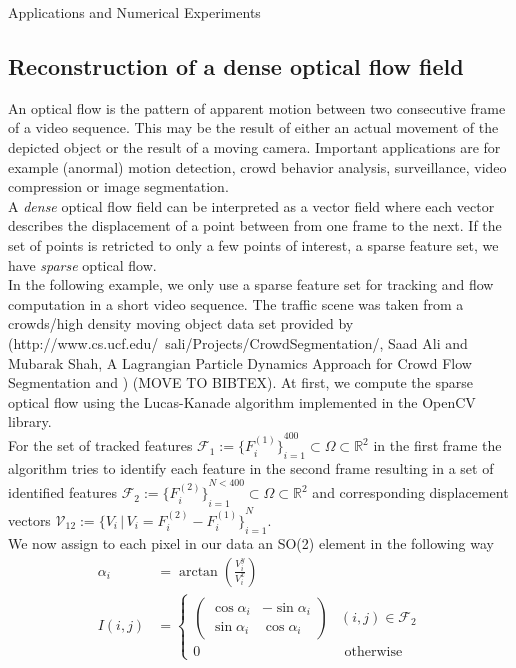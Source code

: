 \begin{chapter}{Applications and Numerical Experiments}
\FloatBarrier
\subsection{Reconstruction of a dense optical flow field} %
\label{sub:reconstructionDenseOpticalFlow}
An optical flow is the pattern of apparent motion between two consecutive frame of a video sequence. This may be the result of either an actual movement of the depicted object
or the result of a moving camera. Important applications are for example (anormal) motion detection, crowd behavior analysis, surveillance, video compression or image segmentation.\\
A \emph{dense} optical flow field can be interpreted as a vector field where each vector describes the displacement of a point between from one frame to the next. If
the set of points is retricted to only a few points of interest, a sparse feature set, we have \emph{sparse} optical flow.\\

In the following example, we only use a sparse feature set for tracking and flow computation in a short video sequence. The traffic scene was taken from a crowds/high density moving object data 
set provided by \cite{sali} (http://www.cs.ucf.edu/~sali/Projects/CrowdSegmentation/, Saad Ali and Mubarak Shah, A Lagrangian Particle Dynamics Approach for Crowd Flow Segmentation and )
(MOVE TO BIBTEX). At first, we compute the sparse optical flow using the Lucas-Kanade algorithm \cite{LucasKanade} implemented in the OpenCV library. \\
For the set of tracked features 
$\mathcal{F}_1:=\lbrace{F^{(1)}_i\rbrace}_{i=1}^{400}\subset\Omega\subset\mathbb{R}^2$ in the first frame the algorithm tries to identify each feature in the second frame resulting in a set of
identified features $\mathcal{F}_2:=\lbrace{F^{(2)}_i\rbrace}_{i=1}^{N<400}\subset\Omega\subset\mathbb{R}^2$ and corresponding displacement vectors 
$\mathcal{V}_{12}:=\lbrace{V_i\,|\,V_i=F_i^{(2)}-F_i^{(1)}\rbrace}_{i=1}^{N}$.\\

We now assign to each pixel in our data an SO(2) element in the following way
\begin{align}
    \alpha_i &=\arctan\left(\frac{V^y_i}{V^x_i}\right) \\
    I(i,j) &= 
    \begin{cases}
    	\begin{pmatrix}
	    \cos\alpha_i    & -\sin\alpha_i\\
	    \sin\alpha_i    & \cos\alpha_i
	\end{pmatrix} & (i,j)\in \mathcal{F}_{2} \\
	0 & \text{ otherwise}
    \end{cases}
\end{align}


\end{chapter}
